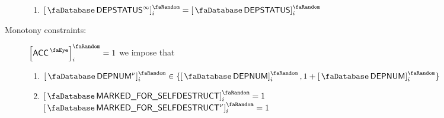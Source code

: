 \begin{description}
\begin{enumerate}
			\item $\order{\accDepStatus^\infty}_{i} = \order{\accDepStatus}_{i}$ 
		\end{enumerate}
	\item[Monotony constraints:]
		\If $\order{\peekAccount}_{i} = 1$ \Then
		we impose that
		\begin{enumerate}
			\item $ \order{\accDepNumber \new }_{i} \in \{ \order{\accDepNumber  }_{i}, 1 + \order{\accDepNumber  }_{i} \} $
			\item \If $ \order{\accMarkedForSelfdestruct}_{i} = 1$ \\
				\Then $\order{\accMarkedForSelfdestruct\new}_{i} = 1 $
		\end{enumerate}
\end{description}
